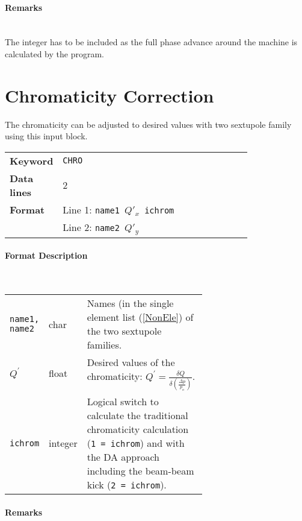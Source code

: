 \paragraph{Remarks}~\\

The integer has to be included as the full phase advance around the machine is calculated by the program.

\section{Chromaticity Correction} \label{ChrCor}

The chromaticity can be adjusted to desired values with two sextupole family using this input block.

\bigskip
\begin{tabular}{@{}lp{0.8\linewidth}}
    \textbf{Keyword}    & \texttt{CHRO} \\
    \textbf{Data lines} & 2 \\
    \textbf{Format}     & Line 1: \texttt{name1 $Q'_x$ ichrom} \\
                        & Line 2: \texttt{name2 $Q'_y$}
\end{tabular}

\paragraph{Format Description}~

\bigskip
\begin{longtabu}{@{}llp{0.65\linewidth}}
    \texttt{name1, name2} & char    & Names (in the single element list (\ref{NonEle}) of the two sextupole families. \\
    \texttt{$Q^\prime$}   & float   & Desired values of the chromaticity: $Q^\prime=\frac{\delta Q}{\delta( \frac{\Delta p}{p_o})}$. \\
    \texttt{ichrom}       & integer & Logical switch to calculate the traditional chromaticity calculation (\texttt{1 = ichrom}) and with the DA approach including the beam-beam kick (\texttt{2 = ichrom}). \\
\end{longtabu}

\paragraph{Remarks}~\\

